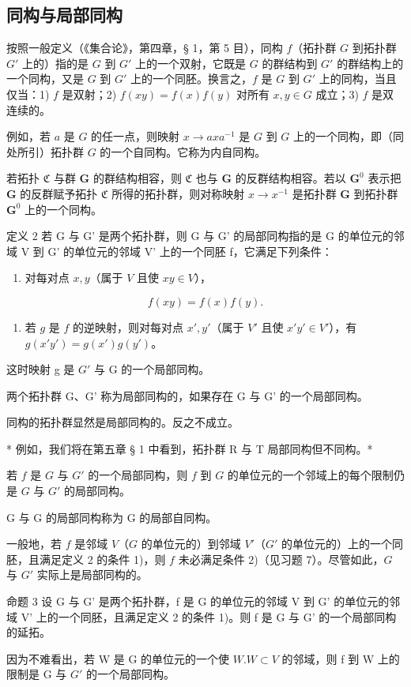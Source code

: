 \subsection{同构与局部同构}

按照一般定义（《集合论》，第四章，§ 1，第 5 目），同构 \(f\)（拓扑群 \(G\) 到拓扑群 \(G'\) 上的）指的是 \(G\) 到 \(G'\) 上的一个双射，它既是 \(G\) 的群结构到 \(G'\) 的群结构上的一个同构，又是 \(G\) 到 \(G'\) 上的一个同胚。换言之，\(f\) 是 \(G\) 到 \(G'\) 上的同构，当且仅当：1) \(f\) 是双射；2) \(f(xy) = f(x)f(y)\) 对所有 \(x, y \in G\) 成立；3) \(f\) 是双连续的。

例如，若 \(a\) 是 \(G\) 的任一点，则映射 \(x \to axa^{-1}\) 是 \(G\) 到 \(G\) 上的一个同构，即（同处所引）拓扑群 \(G\) 的一个自同构。它称为内自同构。

若拓扑 \(\mathfrak{C}\) 与群 \(\mathbf{G}\) 的群结构相容，则 \(\mathfrak{C}\) 也与 \(\mathbf{G}\) 的反群结构相容。若以 \(\mathbf{G}^0\) 表示把 \(\mathbf{G}\) 的反群赋予拓扑 \(\mathfrak{C}\) 所得的拓扑群，则对称映射 \(x \to x^{-1}\) 是拓扑群 \(\mathbf{G}\) 到拓扑群 \(\mathbf{G}^0\) 上的一个同构。

定义 2 若 G 与 G' 是两个拓扑群，则 G 与 G' 的局部同构指的是 G 的单位元的邻域 V 到 G' 的单位元的邻域 V' 上的一个同胚 f，它满足下列条件：

\begin{enumerate}
\def\labelenumi{\arabic{enumi})}
\tightlist
\item
  对每对点 \(x, y\)（属于 \(V\) 且使 \(xy \in V\)），
\end{enumerate}

\[
f (x y) = f (x) f (y).
\]

\begin{enumerate}
\def\labelenumi{\arabic{enumi})}
\setcounter{enumi}{1}
\tightlist
\item
  若 \(g\) 是 \(f\) 的逆映射，则对每对点 \(x', y'\)（属于 \(V'\) 且使 \(x'y' \in V'\)），有 \(g(x'y') = g(x')g(y')\)。
\end{enumerate}

这时映射 g 是 \(G'\) 与 G 的一个局部同构。

两个拓扑群 G、G' 称为局部同构的，如果存在 G 与 G' 的一个局部同构。

同构的拓扑群显然是局部同构的。反之不成立。

* 例如，我们将在第五章 § 1 中看到，拓扑群 R 与 T 局部同构但不同构。*

若 \(f\) 是 \(G\) 与 \(G'\) 的一个局部同构，则 \(f\) 到 \(G\) 的单位元的一个邻域上的每个限制仍是 \(G\) 与 \(G'\) 的局部同构。

G 与 G 的局部同构称为 G 的局部自同构。

一般地，若 \(f\) 是邻域 \(V\)（\(G\) 的单位元的）到邻域 \(V'\)（\(G'\) 的单位元的）上的一个同胚，且满足定义 2 的条件 1)，则 \(f\) 未必满足条件 2)（见习题 7）。尽管如此，\(G\) 与 \(G'\) 实际上是局部同构的。

命题 3 设 G 与 G' 是两个拓扑群，f 是 G 的单位元的邻域 V 到 G' 的单位元的邻域 V' 上的一个同胚，且满足定义 2 的条件 1)。则 f 是 G 与 G' 的一个局部同构的延拓。

因为不难看出，若 W 是 G 的单位元的一个使 \(W.W \subset V\) 的邻域，则 f 到 W 上的限制是 G 与 \(G'\) 的一个局部同构。

